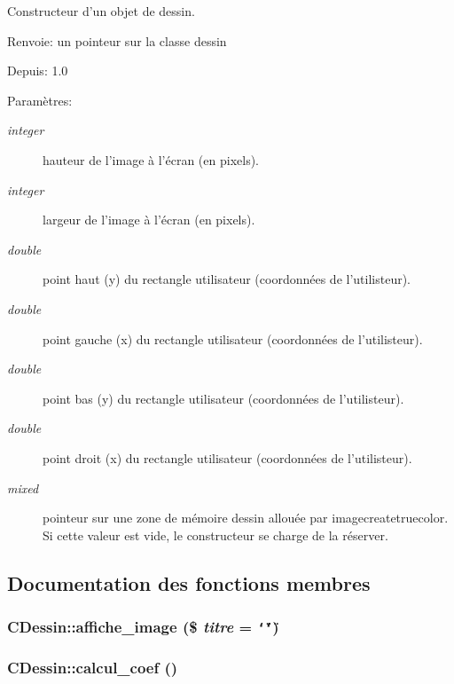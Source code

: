 Constructeur d'un objet de dessin. \begin{Desc}
\item[Renvoie:]un pointeur sur la classe dessin  \end{Desc}
\begin{Desc}
\item[Depuis:]1.0 \end{Desc}
\begin{Desc}
\item[Param\`{e}tres:]
\begin{description}
\item[{\em integer}]hauteur de l'image \`{a} l'\'{e}cran (en pixels). \item[{\em integer}]largeur de l'image \`{a} l'\'{e}cran (en pixels). \item[{\em double}]point haut (y) du rectangle utilisateur (coordonn\'{e}es de l'utilisteur). \item[{\em double}]point gauche (x) du rectangle utilisateur (coordonn\'{e}es de l'utilisteur). \item[{\em double}]point bas (y) du rectangle utilisateur (coordonn\'{e}es de l'utilisteur). \item[{\em double}]point droit (x) du rectangle utilisateur (coordonn\'{e}es de l'utilisteur). \item[{\em mixed}]pointeur sur une zone de m\'{e}moire dessin allou\'{e}e par imagecreatetruecolor. Si cette valeur est vide, le constructeur se charge de la r\'{e}server.\end{description}
\end{Desc}


\subsection{Documentation des fonctions membres}
\hypertarget{classCDessin_a15}{
\subsubsection[affiche\_\-image]{\setlength{\rightskip}{0pt plus 5cm}CDessin::affiche\_\-image (\$ {\em titre} = {\tt \char`\"{}\char`\"{}})}}
\label{classCDessin_a15}


\hypertarget{classCDessin_a4}{
\subsubsection[calcul\_\-coef]{\setlength{\rightskip}{0pt plus 5cm}CDessin::calcul\_\-coef ()}}
\label{classCDessin_a4}


